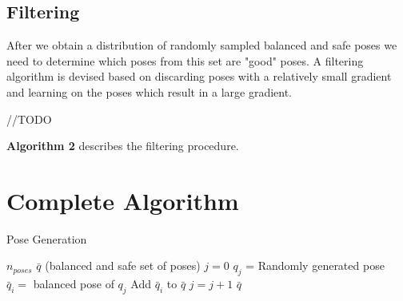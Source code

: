 \documentclass[letterpaper, 10pt, conference]{ieeeconf}
\begin{document}
\subsection{Filtering}
After we obtain a distribution of randomly sampled balanced and safe poses we
need to determine which poses from this set are "good" poses. A filtering
algorithm is devised based on discarding poses with a relatively small gradient and
learning on the poses which result in a large gradient.

//TODO

\textbf{Algorithm 2} describes the filtering procedure.

\section{Complete Algorithm}


\begin{algorithm}
    \caption{Pose Generation}
    \begin{algorithmic}[1]
        \renewcommand{\algorithmicrequire}{\textbf{Input:}}
        \renewcommand{\algorithmicensure}{\textbf{Output:}}
        \REQUIRE $n_{poses}$
        \ENSURE  $\bar{q} $ (balanced and safe set of poses)
        \STATE $j = 0$
        \STATE $q_j $ = Randomly generated pose
        \STATE $\bar{q}_i =$ balanced pose of $q_j$
        \STATE Add $\bar{q}_i $ to $\bar{q}$
        \ENDIF
        \STATE $ j = j + 1 $
        \ENDWHILE
        \RETURN $\bar{q}$
    \end{algorithmic}
\end{algorithm}
\end{document}
